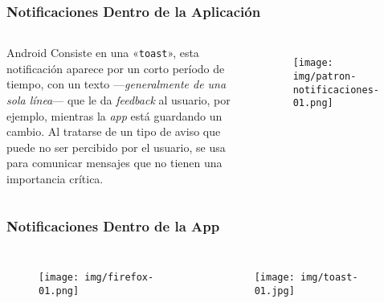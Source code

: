 \documentclass{beamer}
\begin{document}

\begin{frame}
\frametitle{Notificaciones Dentro de la Aplicación}

\begin{columns}[c] %

\begin{block}{Android}
\justify
Consiste en una «\texttt{toast}», esta notificación aparece por un corto período de tiempo, con un texto —\textit{generalmente de una sola línea}— que le da \textit{feedback} al usuario, por ejemplo, mientras la \textit{app} está guardando un cambio. Al tratarse de un tipo de aviso que puede no ser percibido por el usuario, se usa para comunicar mensajes que no tienen una importancia crítica.
\end{block}

\begin{figure}[H]
  \centering
  \texttt{[image: img/patron-notificaciones-01.png]}
\end{figure}
\end{columns}
\end{frame}


\begin{frame}
\frametitle{Notificaciones Dentro de la App}

\begin{columns}[c] %

\begin{figure}[H]
  \centering
  \texttt{[image: img/firefox-01.png]}
\end{figure}

\begin{figure}[H]
  \centering
  \texttt{[image: img/toast-01.jpg]}
\end{figure}

\end{columns}
\end{frame}

\end{document}
